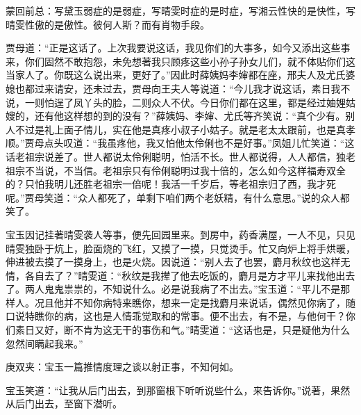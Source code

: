 

\begin{parag}
    \begin{note}蒙回前总：写黛玉弱症的是弱症，写晴雯时症的是时症，写湘云性快的是快性，写晴雯性傲的是傲性。彼何人斯？而有肖物手段。\end{note}
\end{parag}


\begin{parag}
    贾母道：“正是这话了。上次我要说这话，我见你们的大事多，如今又添出这些事来，你们固然不敢抱怨，未免想著我只顾疼这些小孙子孙女儿们，就不体贴你们这当家人了。你既这么说出来，更好了。”因此时薛姨妈李婶都在座，邢夫人及尤氏婆媳也都过来请安，还未过去，贾母向王夫人等说道：“今儿我才说这话，素日我不说，一则怕逞了凤丫头的脸，二则众人不伏。今日你们都在这里，都是经过妯娌姑嫂的，还有他这样想的到的没有？”薛姨妈、李婶、尤氏等齐笑说：“真个少有。别人不过是礼上面子情儿，实在他是真疼小叔子小姑子。就是老太太跟前，也是真孝顺。”贾母点头叹道：“我虽疼他，我又怕他太伶俐也不是好事。”凤姐儿忙笑道：“这话老祖宗说差了。世人都说太伶俐聪明，怕活不长。世人都说得，人人都信，独老祖宗不当说，不当信。老祖宗只有伶俐聪明过我十倍的，怎么如今这样福寿双全的？只怕我明儿还胜老祖宗一倍呢！我活一千岁后，等老祖宗归了西，我才死呢。”贾母笑道：“众人都死了，单剩下咱们两个老妖精，有什么意思。”说的众人都笑了。
\end{parag}


\begin{parag}
    宝玉因记挂著晴雯袭人等事，便先回园里来。到房中，药香满屋，一人不见，只见晴雯独卧于炕上，脸面烧的飞红，又摸了一摸，只觉烫手。忙又向炉上将手烘暖，伸进被去摸了一摸身上，也是火烧。因说道：“别人去了也罢，麝月秋纹也这样无情，各自去了？”晴雯道：“秋纹是我撵了他去吃饭的，麝月是方才平儿来找他出去了。两人鬼鬼祟祟的，不知说什么。必是说我病了不出去。”宝玉道：“平儿不是那样人。况且他并不知你病特来瞧你，想来一定是找麝月来说话，偶然见你病了，随口说特瞧你的病，这也是人情乖觉取和的常事。便不出去，有不是，与他何干？你们素日又好，断不肯为这无干的事伤和气。”晴雯道：“这话也是，只是疑他为什么忽然间瞒起我来。”\begin{note}庚双夹：宝玉一篇推情度理之谈以射正事，不知何如。\end{note}宝玉笑道：“让我从后门出去，到那窗根下听听说些什么，来告诉你。”说著，果然从后门出去，至窗下潜听。
\end{parag}


